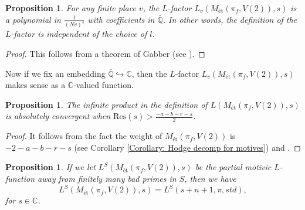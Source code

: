\documentclass[11pt, a4paper]{amsart}
\theoremstyle{plain}
\newtheorem{proposition}[theorem]{Proposition}
\theoremstyle{definition}
\numberwithin{equation}{section}
\def\CC{\mathbb{C}}
\def\QQ{\mathbb{Q}}
\begin{document}
\begin{proposition}
\label{Prop: indep of l}
    For any finite place $v$, the $L$-factor $L_{v}(M_{\text{\'{e}t}}(\pi_{f}, V(2)), s)$ is a polynomial in $\frac{1}{(Nv)^{s}}$ with coefficients in $\overline{\QQ}$.
    In other words, the definition of the $L$-factor is independent of the choice of $l$. 
\end{proposition}

\begin{proof}
    This follows from a theorem of Gabber (see \cite[Theorem 1]{Fujiwara00}). 
\end{proof}

Now if we fix an embedding $\overline{\QQ} \hookrightarrow \CC$, then the $L$-factor $L_{v}(M_{\text{\'{e}t}}(\pi_{f}, V(2)), s)$ makes sense as a $\CC$-valued function. 

\begin{proposition}
\label{Prop: convergence region of motivic L-function}
    The infinite product in the definition of $L(M_{\text{\'{e}t}}(\pi_{f}, V(2)), s)$ is absolutely convergent when $\mathrm{Res}(s) > \frac{-a - b - r - s}{2}$. 
\end{proposition}

\begin{proof}
    It follows from the fact the weight of $M_{\text{\'{e}t}}(\pi_{f}, V(2))$ is $-2 - a - b - r - s$ (see Corollary \ref{Corollary: Hodge decomp for motives}) and \cite[(1.5)]{Nekovar94}. 
\end{proof}

\begin{proposition}
\label{Prop:rel_L_ftn}
        If we let $L^{S}(M_{\text{\'{e}t}}(\pi_f, V(2)), s)$ be the partial motivic $L$-function away from finitely many bad primes in $S$,  then we have 
        \begin{equation*}
            L^{S}(M_{\text{\'{e}t}}(\pi_f, V(2)), s) = L^{S}(s + n + 1, \pi, std),
        \end{equation*}
        for $s \in \CC$. 
\end{proposition}
\end{document}
